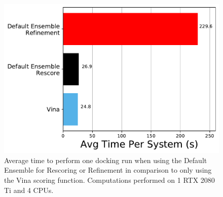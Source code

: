 \documentclass[journal=jcisd8,manuscript=article]{achemso}
\begin{document}
\begin{figure}
    \centering
    \includegraphics{figures/other/refine_timing_comparison.pdf}
    \caption{Average time to perform one docking run when using the Default Ensemble for Rescoring or Refinement in comparison to only using the Vina scoring function. Computations performed on 1 RTX 2080 Ti and 4 CPUs.}
    \label{fig:RefineTiming}
\end{figure}
\end{document}
